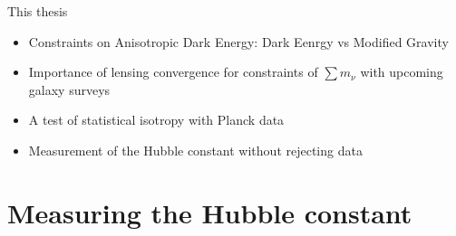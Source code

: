 \documentclass{beamer}
\begin{document}
%
%
%
%
%
%
%
%
%
%
%
%
%

\begin{frame}{This thesis}
\begin{itemize}
\item Constraints on Anisotropic Dark Energy: Dark Eenrgy vs Modified Gravity
\item Importance of lensing convergence for constraints of $\sum m_\nu$ with upcoming galaxy surveys
\item A test of statistical isotropy with Planck data
\item Measurement of the Hubble constant without rejecting data  
\end{itemize}
\end{frame}


\section{Measuring the Hubble constant}
\end{document}
